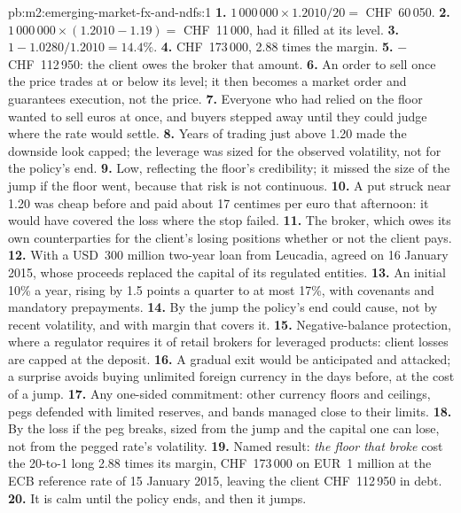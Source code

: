 \begin{solution}{pb:m2:emerging-market-fx-and-ndfs:1}
\textbf{1.} $1\,000\,000 \times 1.2010/20 = $ CHF~60\,050.
\textbf{2.} $1\,000\,000 \times (1.2010 - 1.19) = $ CHF~11\,000, had it filled at
its level.
\textbf{3.} $1 - 1.0280/1.2010 = 14.4\%$.
\textbf{4.} CHF~173\,000, 2.88 times the margin.
\textbf{5.} $-$CHF~112\,950: the client owes the broker that amount.
\textbf{6.} An order to sell once the price trades at or below its level; it then
becomes a market order and guarantees execution, not the price.
\textbf{7.} Everyone who had relied on the floor wanted to sell euros at once, and
buyers stepped away until they could judge where the rate would settle.
\textbf{8.} Years of trading just above 1.20 made the downside look capped; the
leverage was sized for the observed volatility, not for the policy's end.
\textbf{9.} Low, reflecting the floor's credibility; it missed the size of the
jump if the floor went, because that risk is not continuous.
\textbf{10.} A put struck near 1.20 was cheap before and paid about 17 centimes
per euro that afternoon: it would have covered the loss where the stop failed.
\textbf{11.} The broker, which owes its own counterparties for the client's
losing positions whether or not the client pays.
\textbf{12.} With a USD~300 million two-year loan from Leucadia, agreed on 16
January 2015, whose proceeds replaced the capital of its regulated entities.
\textbf{13.} An initial 10\% a year, rising by 1.5 points a quarter to at most
17\%, with covenants and mandatory prepayments.
\textbf{14.} By the jump the policy's end could cause, not by recent volatility,
and with margin that covers it.
\textbf{15.} Negative-balance protection, where a regulator requires it of
retail brokers for leveraged products: client losses are capped at the deposit.
\textbf{16.} A gradual exit would be anticipated and attacked; a surprise avoids
buying unlimited foreign currency in the days before, at the cost of a jump.
\textbf{17.} Any one-sided commitment: other currency floors and ceilings, pegs
defended with limited reserves, and bands managed close to their limits.
\textbf{18.} By the loss if the peg breaks, sized from the jump and the capital
one can lose, not from the pegged rate's volatility.
\textbf{19.} Named result: \emph{the floor that broke} cost the 20-to-1 long
2.88 times its margin, CHF~173\,000 on EUR~1 million at the ECB reference rate of
15 January 2015, leaving the client CHF~112\,950 in debt.
\textbf{20.} It is calm until the policy ends, and then it jumps.
\end{solution}

